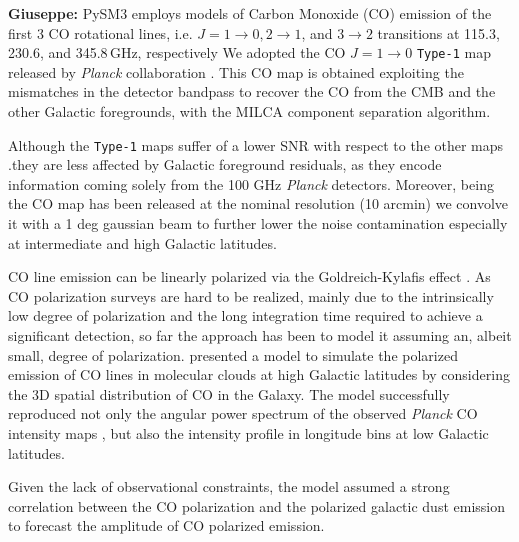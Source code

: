 \textbf{Giuseppe:} 
PySM3 employs models of Carbon Monoxide (CO) emission  of  the first 3 CO rotational lines, i.e.    $J = 1\rightarrow0, 2\rightarrow1$, and $3\rightarrow2$ transitions at 115.3, 230.6, and 345.8\,GHz, respectively
 We adopted  the CO $J = 1\rightarrow0$ \texttt{Type-1}   map  released   by \emph{Planck } collaboration  \cite{}.  This CO map  is obtained exploiting the mismatches in the detector bandpass to recover the CO from the CMB and the other Galactic foregrounds, with the MILCA component separation algorithm.  
 
 Although the    \texttt{Type-1} maps suffer of a lower SNR  with respect to the other maps .they are less affected by Galactic foreground residuals, as they encode information coming solely from the 100 GHz \emph{Planck} detectors. 
 Moreover, being the  CO map has been released at the nominal resolution (10  arcmin) we convolve it with a 1 deg gaussian beam to further lower the noise contamination  especially at intermediate and high Galactic latitudes. 


CO line emission can be linearly polarized via the Goldreich-Kylafis effect \citep{Goldreich1981, Crutcher2012}.  As CO polarization surveys are hard to be realized,  mainly due to the intrinsically low degree of polarization and the long integration time required to achieve a significant detection,  so far the approach has been to model it assuming an, albeit small, degree of polarization. \citet{Puglisi2016a} presented a model to simulate the polarized emission of CO lines in molecular clouds at high Galactic latitudes by considering the 3D spatial distribution of CO in the Galaxy. The model   successfully reproduced not only the angular power spectrum of the observed \emph{Planck}  CO intensity maps ,  but also the intensity profile  in longitude bins at low Galactic latitudes.  

Given the lack of observational constraints, the model assumed a strong correlation between the CO polarization and the polarized galactic dust emission to forecast the amplitude of CO polarized emission.